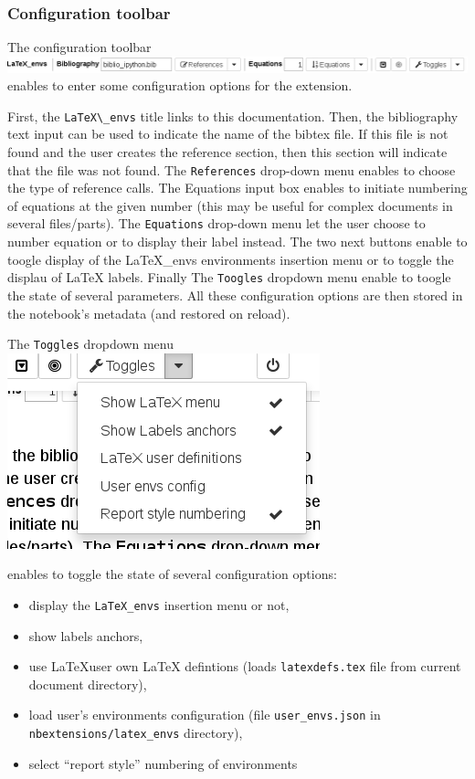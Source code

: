     \subsubsection{Configuration toolbar}\label{configuration-toolbar}

    The configuration toolbar \includegraphics{config_toolbar.png} enables
to enter some configuration options for the extension.

First, the \texttt{LaTeX\textbackslash{}\_envs} title links to this
documentation. Then, the bibliography text input can be used to indicate
the name of the bibtex file. If this file is not found and the user
creates the reference section, then this section will indicate that the
file was not found. The \texttt{References} drop-down menu enables to
choose the type of reference calls. The Equations input box enables to
initiate numbering of equations at the given number (this may be useful
for complex documents in several files/parts). The \texttt{Equations}
drop-down menu let the user choose to number equation or to display
their label instead. The two next buttons enable to toogle display of
the LaTeX\_envs environments insertion menu or to toggle the displau of
LaTeX labels. Finally The \texttt{Toogles} dropdown menu enable to
toogle the state of several parameters. All these configuration options
are then stored in the notebook's metadata (and restored on reload).

    The \texttt{Toggles} dropdown menu \includegraphics{Toggles.png}

enables to toggle the state of several configuration options:

\begin{itemize}
\tightlist
\item
  display the \texttt{LaTeX\_envs} insertion menu or not,
\item
  show labels anchors,
\item
  use \LaTeX user own LaTeX defintions (loads \texttt{latexdefs.tex}
  file from current document directory),
\item
  load user's environments configuration (file \texttt{user\_envs.json}
  in \texttt{nbextensions/latex\_envs} directory),
\item
  select ``report style'' numbering of environments
\end{itemize}

